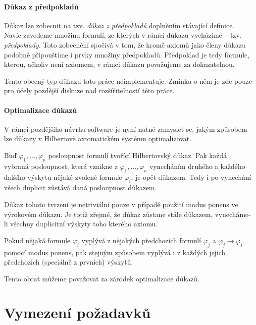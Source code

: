 \documentclass[thesis=B,czech,hidelinks]{FITthesis}[2012/06/26]
\begin{document}
\subsubsection{Důkaz z předpokladů}
\label{sec:dzp}

Důkaz lze zobecnit na tzv. \emph{důkaz z předpokladů} doplněním stávající definice. Navíc zavedeme množinu formulí, ze kterých v rámci důkazu vycházíme -- tzv. \emph{předpoklady}. Toto zobecnění spočívá v tom, že kromě axiomů jako členy důkazu podobně připouštíme i prvky množiny předpokladů. Předpoklad je tedy formule, kterou, ačkoliv není axiomem, v rámci důkazu považujeme za dokazatelnou.

Tento obecný typ důkazu tato práce neimplementuje. Zmínka o něm je zde pouze pro účely pozdější diskuze nad rozšířitelností této práce.

\subsubsection{Optimalizace důkazů}

V rámci pozdějšího návrhu software je nyní nutné zamyslet se, jakým způsobem lze důkazy v Hilbertově axiomatickém systému optimalizovat.

\begin{lm}
Buď $\varphi_1, \ldots, \varphi_n$ posloupnost formulí tvořící Hilbertovský důkaz. Pak každá vybraná posloupnost, která vznikne z $\varphi_1, \ldots, \varphi_n$ vynecháním druhého a každého dalšího výskytu nějaké zvolené formule $\varphi_i$, je opět důkazem. Tedy i po vynechání všech duplicit zůstává daná posloupnost důkazem.
\end{lm}

Důkaz tohoto tvrzení je netriviální pouze v případě použití modus ponens ve výrokovém důkazu. Je totiž zřejmé, že důkaz zůstane stále důkazem, vynecháme-li všechny duplicitní výskyty toho kterého axiomu.

\begin{pf}
Pokud nějaká formule $\varphi_i$ vyplývá z nějakých předchozích formulí $\varphi_j$ a $\varphi_j \to \varphi_i$ pomocí modus ponens, pak stejným způsobem vyplývá i z každých jejich předchozích (speciálně z prvních) výskytů.
\end{pf}

Tento obrat můžeme považovat za zárodek optimalizace důkazů.

%
%
%

\chapter{Vymezení požadavků}
\end{document}
